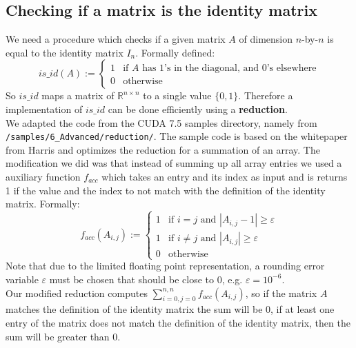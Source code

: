 \subsection*{Checking if a matrix is the identity matrix}
We need a procedure which checks if a given matrix $A$ of dimension $n$-by-$n$ is equal to the identity matrix $I_n$. Formally defined:
\begin{equation*}
is\_id(A) := \begin{cases}
1 & \text{if } A \text{ has 1's in the diagonal, and 0's elsewhere}\\
0 & \text{otherwise}
\end{cases}
\end{equation*}
So $is\_id$ maps a matrix of $\mathbb{R}^{n \times n}$ to a single value $\{0,1 \}$. Therefore a implementation of $is\_id$ can be done efficiently using a \textbf{reduction}.  \\
We adapted the code from the CUDA 7.5 samples directory, namely from \texttt{/samples/6\_Advanced/reduction/}. The sample code is based on the whitepaper from Harris \cite{Harris2010} and optimizes the reduction for a summation of an array. The modification we did was that instead of summing up all array entries we used a auxiliary function $f_{acc}$ which takes an entry and its index as input and is returns 1 if  the value and the index to not match with the definition of the identity matrix. Formally:
\begin{equation}
f_{acc}(A_{i,j}) := \begin{cases} 1 & \text{if }i = j \text{ and } |A_{i,j}-1| \geq \varepsilon\\
1 & \text{if } i \neq j \text{ and } |A_{i,j}| \geq \varepsilon\\
0 & \text{otherwise}	\end{cases}
\end{equation}
Note that due to the limited floating point representation, a rounding error variable $\varepsilon$ must be chosen that should be close to 0, e.g. $\varepsilon = 10^{-6}$. \\
Our modified reduction computes $\sum_{i=0,j=0}^{n,n} f_{acc}(A_{i,j})$, so if the matrix $A$ matches the definition of the identity matrix the sum will be 0, if at least one entry of the matrix does not match the definition of the identity matrix, then the sum will be greater than 0.

